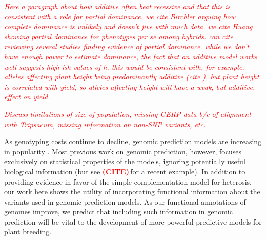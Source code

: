 \documentclass[twoside,twocolumn, letterpaper]{article}
\newcommand{\citex}{\textcolor{red}{\bf (CITE)\,}}
\newcommand{\jri}[1]{\textcolor{red}{ \emph{ #1}} }
\begin{document}
\jri{Here a paragraph about how additive often beat recessive and that this is consistent with a role for partial dominance. we cite Birchler arguing how complete dominance is unlikely and doesn't jive with much data. we cite Huang showing partial dominance for phenotypes per se among hybrids. can cite \citep{halligan2009spontaneous} reviewing several studies finding evidence of partial dominance. while we don't have enough power to estimate dominance, the fact that an additive model works well suggests high-ish values of h. this would be consistent with, for example, alleles affecting plant height  being predominantly additive (cite \citep{peiffer2014genetic}), but plant height is correlated with yield, so alleles affecting height will have a weak, but additive, effect on yield.  }

\jri{Discuss limitations of size of population, missing GERP data b/c of alignment with Tripsacum, missing information on non-SNP variants, etc.}

As genotyping costs continue to decline, genomic prediction models are increasing in popularity \citep{desta2014genomic}. 
Most previous work on genomic prediction, however, focuses exclusively on statistical properties of the models, ignoring potentially useful biological information (but see \citex for a recent example). 
In addition to providing evidence in favor of the simple complementation model for heterosis, our work here shows the utility of incorporating functional information about the variants used in genomic prediction models.  
As our functional annotations of genomes improve, we predict that including such information in genomic prediction will be vital to the development of more powerful predictive models for plant breeding.
\end{document}
